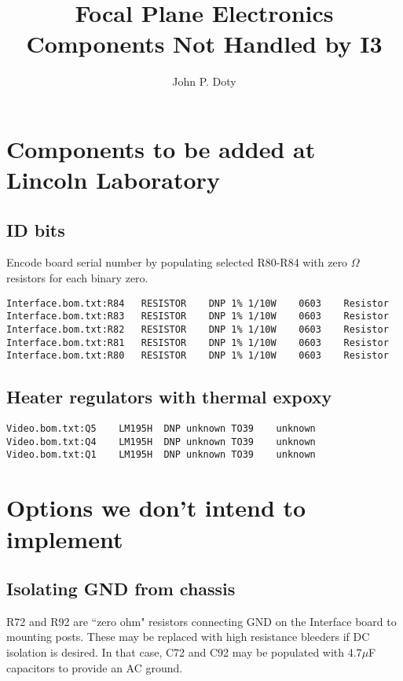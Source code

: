 \documentclass[11pt]{article}
\author{
John P. Doty
}
\title{Focal Plane Electronics Components Not Handled by I3}
\date{}
\begin{document}
\maketitle
\begin{center}

\end{center}


\section{Components to be added at Lincoln Laboratory}

\subsection{ID bits}

Encode board serial number
by populating selected R80-R84
with zero $\Omega$ resistors for
each binary zero.

\begin{verbatim}
Interface.bom.txt:R84	RESISTOR	DNP	1% 1/10W	0603	Resistor	
Interface.bom.txt:R83	RESISTOR	DNP	1% 1/10W	0603	Resistor	
Interface.bom.txt:R82	RESISTOR	DNP	1% 1/10W	0603	Resistor	
Interface.bom.txt:R81	RESISTOR	DNP	1% 1/10W	0603	Resistor	
Interface.bom.txt:R80	RESISTOR	DNP	1% 1/10W	0603	Resistor	
\end{verbatim}

\subsection{Heater regulators with thermal expoxy}
\begin{verbatim}
Video.bom.txt:Q5	LM195H	DNP	unknown	TO39	unknown	
Video.bom.txt:Q4	LM195H	DNP	unknown	TO39	unknown	
Video.bom.txt:Q1	LM195H	DNP	unknown	TO39	unknown	
\end{verbatim}


\section{Options we don't intend to implement}

\subsection{Isolating GND from chassis}

R72 and R92 are ``zero ohm" resistors connecting GND on the Interface board to mounting posts. These may be replaced with high resistance bleeders if DC isolation is desired. In that case, C72 and C92 may be populated with 4.7$\mu$F capacitors to provide an AC ground.
\end{document}
